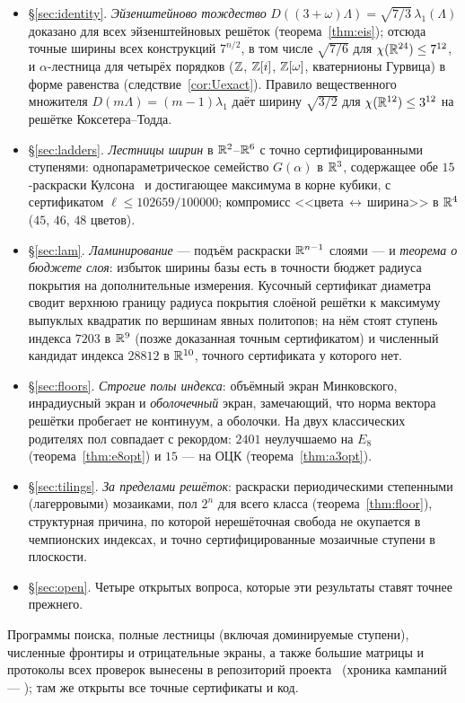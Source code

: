 \begin{itemize}[leftmargin=1.4em,itemsep=2pt]
\item \S\ref{sec:identity}. \emph{Эйзенштейново тождество}
$D((3+\omega)\Lambda)=\sqrt{7/3}\,\lambda_1(\Lambda)$ доказано для всех
эйзенштейновых решёток (теорема~\ref{thm:eis}); отсюда точные ширины всех
конструкций $7^{n/2}$, в том числе $\sqrt{7/6}$ для $\chi(\mathbb{R}^{24})\le7^{12}$,
и $\alpha$-лестница для четырёх порядков ($\mathbb{Z}$, $\mathbb{Z}[i]$, $\mathbb{Z}[\omega]$,
кватернионы Гурвица) в форме равенства (следствие~\ref{cor:Uexact}). Правило
вещественного множителя $D(m\Lambda)=(m-1)\lambda_1$ даёт ширину
$\sqrt{3/2}$ для $\chi(\mathbb{R}^{12})\le3^{12}$ на решётке Коксетера--Тодда.
\item \S\ref{sec:ladders}. \emph{Лестницы ширин} в $\mathbb{R}^2$--$\mathbb{R}^6$ с точно
сертифицированными ступенями:
однопараметрическое семейство $G(\alpha)$ в $\mathbb{R}^3$, содержащее обе
$15$-раскраски Кулсона~\cite{Coulson} и достигающее максимума в корне
кубики, с сертификатом $\ell\le102659/100000$; компромисс
<<цвета\,$\leftrightarrow$\,ширина>> в $\mathbb{R}^4$ ($45$, $46$, $48$ цветов).
\item \S\ref{sec:lam}. \emph{Ламинирование} --- подъём раскраски $\mathbb{R}^{n-1}$
слоями --- и \emph{теорема о бюджете слоя}: избыток ширины базы есть в
точности бюджет радиуса покрытия на дополнительные измерения. Кусочный
сертификат диаметра сводит верхнюю границу радиуса покрытия слоёной решётки к
максимуму выпуклых квадратик по вершинам явных политопов; на нём стоят
ступень индекса $7203$ в $\mathbb{R}^9$ (позже доказанная точным сертификатом) и
численный кандидат индекса $28812$ в $\mathbb{R}^{10}$, точного сертификата у
которого нет.
\item \S\ref{sec:floors}. \emph{Строгие полы индекса}: объёмный экран
Минковского, инрадиусный экран и \emph{оболочечный} экран, замечающий, что
норма вектора решётки пробегает не континуум, а оболочки. На двух классических
родителях пол совпадает с рекордом: $2401$ неулучшаемо на $E_8$
(теорема~\ref{thm:e8opt}) и $15$ --- на ОЦК (теорема~\ref{thm:a3opt}).
\item \S\ref{sec:tilings}. \emph{За пределами решёток}: раскраски
периодическими степенными (лагерровыми) мозаиками, пол $2^n$ для всего
класса (теорема~\ref{thm:floor}), структурная причина, по которой
нерешёточная свобода не окупается в чемпионских индексах, и точно
сертифицированные мозаичные ступени в плоскости.
\item \S\ref{sec:open}. Четыре открытых вопроса, которые эти результаты
ставят точнее прежнего.
\end{itemize}

Программы поиска, полные лестницы (включая доминируемые ступени),
численные фронтиры и отрицательные экраны, а также большие матрицы и
протоколы всех проверок вынесены в репозиторий проекта~\cite{Repo}
(хроника кампаний --- ); там же открыты все точные
сертификаты и код.
